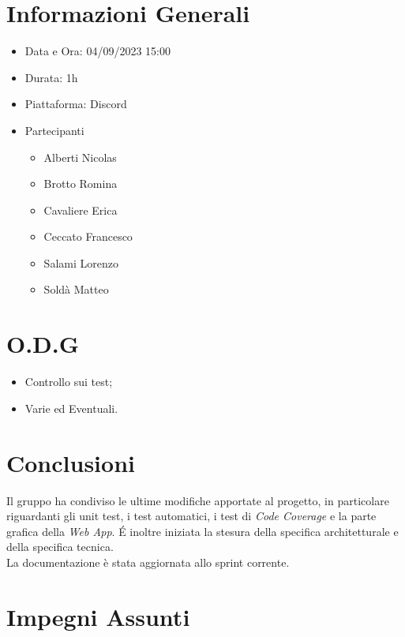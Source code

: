 \documentclass[a4paper, 12pt]{article}
\begin{document}
\makefrontpage

\section*{Informazioni Generali}
\begin{itemize}
    \item Data e Ora: 04/09/2023 15:00
    \item Durata: 1h
    \item Piattaforma: Discord
    \item Partecipanti
    \begin{itemize}
        \item Alberti Nicolas
        \item Brotto Romina
        \item Cavaliere Erica
        \item Ceccato Francesco
        \item Salami Lorenzo
        \item Soldà Matteo
    \end{itemize}
\end{itemize}

\section*{O.D.G}
\begin{itemize}
    \item Controllo sui test;
    \item Varie ed Eventuali.
\end{itemize}

\section*{Conclusioni}
Il gruppo ha condiviso le ultime modifiche apportate al progetto, in particolare riguardanti gli unit test, i test automatici, i test di \textit{Code Coverage} e la parte grafica della \textit{Web App}.
\'E inoltre iniziata la stesura della specifica architetturale e della specifica tecnica.\\
La documentazione è stata aggiornata allo sprint corrente.


\section*{Impegni Assunti}
\end{document}

